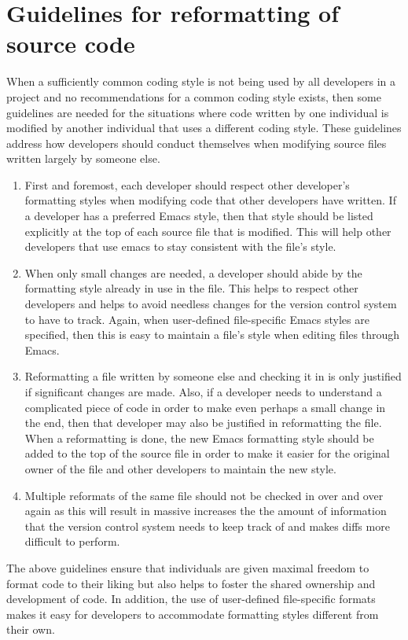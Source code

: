 %
\section{Guidelines for reformatting of source code}
\label{sec:reformatting-guidelines}
%

When a sufficiently common coding style is not being used by all developers in
a project and no recommendations for a common coding style exists, then some
guidelines are needed for the situations where code written by one individual
is modified by another individual that uses a different coding style.  These
guidelines address how developers should conduct themselves when modifying
source files written largely by someone else.

\begin{enumerate}

{}\item First and foremost, each developer should respect other developer's
formatting styles when modifying code that other developers have written.  If
a developer has a preferred Emacs style, then that style should be listed
explicitly at the top of each source file that is modified.  This will help
other developers that use emacs to stay consistent with the file's style.

{}\item When only small changes are needed, a developer should abide by the
formatting style already in use in the file.  This helps to respect other
developers and helps to avoid needless changes for the version control system
to have to track.  Again, when user-defined file-specific Emacs styles are
specified, then this is easy to maintain a file's style when editing files
through Emacs.

{}\item Reformatting a file written by someone else and checking it in is only
justified if significant changes are made.  Also, if a developer needs to
understand a complicated piece of code in order to make even perhaps a small
change in the end, then that developer may also be justified in reformatting
the file.  When a reformatting is done, the new Emacs formatting style should
be added to the top of the source file in order to make it easier for the
original owner of the file and other developers to maintain the new style.

{}\item Multiple reformats of the same file should not be checked in over and
over again as this will result in massive increases the the amount of
information that the version control system needs to keep track of and makes
diffs more difficult to perform.

\end{enumerate}

The above guidelines ensure that individuals are given maximal freedom to
format code to their liking but also helps to foster the shared ownership and
development of code.  In addition, the use of user-defined file-specific
formats makes it easy for developers to accommodate formatting styles
different from their own.
